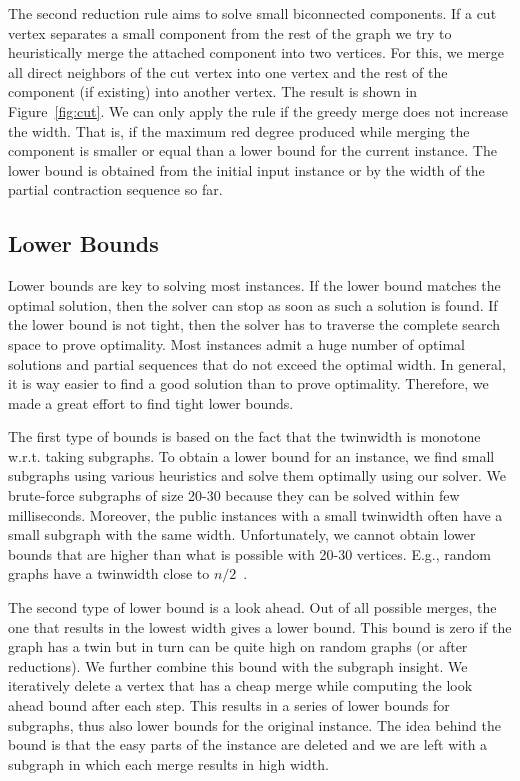 \documentclass[a4paper,UKenglish,cleveref, autoref, thm-restate]{lipics-v2021}
\begin{document}
The second reduction rule aims to solve small biconnected components.
If a cut vertex separates a small component from the rest of the graph we try to heuristically merge the attached component into two vertices.
For this, we merge all direct neighbors of the cut vertex into one vertex and the rest of the component (if existing) into another vertex.
The result is shown in Figure~\ref{fig:cut}.
We can only apply the rule if the greedy merge does not increase the width.
That is, if the maximum red degree produced while merging the component is smaller or equal than a lower bound for the current instance.
The lower bound is obtained from the initial input instance or by the width of the partial contraction sequence so far.


\subsection{Lower Bounds}
Lower bounds are key to solving most instances.
If the lower bound matches the optimal solution, then the solver can stop as soon as such a solution is found.
If the lower bound is not tight, then the solver has to traverse the complete search space to prove optimality.
Most instances admit a huge number of optimal solutions and partial sequences that do not exceed the optimal width.
In general, it is way easier to find a good solution than to prove optimality.
Therefore, we made a great effort to find tight lower bounds.

The first type of bounds is based on the fact that the twinwidth is monotone w.r.t. taking subgraphs.
To obtain a lower bound for an instance, we find small subgraphs using various heuristics and solve them optimally using our solver.
We brute-force subgraphs of size 20-30 because they can be solved within few milliseconds.
Moreover, the public instances with a small twinwidth often have a small subgraph with the same width.
Unfortunately, we cannot obtain lower bounds that are higher than what is possible with 20-30 vertices.
E.g., random graphs have a twinwidth close to $n/2$~\cite{ahn2022twinwidth}.

The second type of lower bound is a look ahead.
Out of all possible merges, the one that results in the lowest width gives a lower bound.
This bound is zero if the graph has a twin but in turn can be quite high on random graphs (or after reductions).
We further combine this bound with the subgraph insight.
We iteratively delete a vertex that has a cheap merge while computing the look ahead bound after each step.
This results in a series of lower bounds for subgraphs, thus also lower bounds for the original instance.
The idea behind the bound is that the easy parts of the instance are deleted and we are left with a subgraph in which each merge results in high width.
\end{document}
